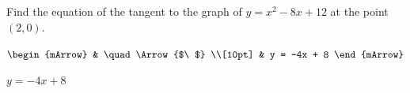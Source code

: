 \clearpage\indent%
\begin{mtask}
    \task Find the equation of the tangent to the graph of $y=x^2 -8x + 12$ at the point $(2, 0)$.
              \begin{envSolution}[height=12cm]
			       $\begin{mArrow}
			             & \quad      \Arrow{$\ $} \\[10pt]
                         & y = -4x + 8	   
	                \end{mArrow}$
              \end{envSolution}			  
			  \begin{exercise}\begin{shortsolution}  
				       $y = -4x + 8$
			  \end{shortsolution}\end{exercise}
\end{mtask}